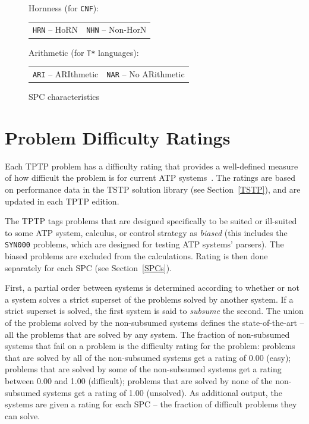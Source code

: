 \documentclass{easychair}
\newenvironment{packed_itemize}{
\vspace*{-0.2em}
\begin{itemize}
\setlength{\partopsep}{0pt}
\setlength{\itemsep}{1pt}
\setlength{\parskip}{0pt}
\setlength{\parsep}{0pt}
}{\end{itemize}}
\begin{document}
\begin{figure}[bht]
\begin{packed_itemize}
\item Hornness (for {\tt CNF}): \\
      \begin{tabular}{@{}p{5cm}l}
      {\tt HRN} -- HoRN &
      {\tt NHN} -- Non-HorN
      \end{tabular}
\item Arithmetic (for {\tt T*} languages): \\
      \begin{tabular}{@{}p{5cm}l}
      {\tt ARI} -- ARIthmetic &
      {\tt NAR} -- No ARithmetic
      \end{tabular}
\end{packed_itemize}
\caption{SPC characteristics}
\label{SPCCharacteristics}
\end{figure} 

\section{Problem Difficulty Ratings}
\label{Ratings}

Each TPTP problem has a difficulty rating that provides a well-defined measure of how difficult 
the problem is for current ATP systems~\cite{SS01}.
The ratings are based on performance data in the TSTP solution library (see Section~\ref{TSTP}), 
and are updated in each TPTP edition.

The TPTP tags problems that are designed specifically to be suited or ill-suited to some ATP
system, calculus, or control strategy as {\em biased}
(this includes the {\tt SYN000} problems, which are designed for testing ATP systems' parsers).
The biased problems are excluded from the calculations.
Rating is then done separately for each SPC (see Section~\ref{SPCs}).

First, a partial order between systems is determined according to whether or not a system 
solves a strict superset of the problems solved by another system. 
If a strict superset is solved, the first system is said to {\em subsume} the second. 
The union of the problems solved by the non-subsumed systems defines the state-of-the-art -- all 
the problems that are solved by any system. 
The fraction of non-subsumed systems that fail on a problem is the difficulty rating 
for the problem:
problems that are solved by all of the non-subsumed systems get a rating of 0.00 (easy);
problems that are solved by some of the non-subsumed systems get a rating between 0.00 and 1.00 
(difficult); 
problems that are solved by none of the non-subsumed systems get a rating of 1.00 (unsolved).
As additional output, the systems are given a rating for each SPC -- the fraction of difficult 
problems they can solve.
\end{document}
